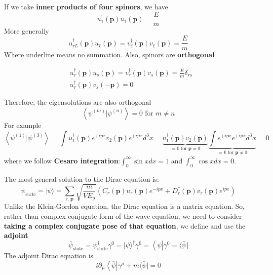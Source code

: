 If we take \textbf{inner products of four spinors}, we have
$$
u_{1}^{\dagger}(\mathbf{p}) u_{1}(\mathbf{p})=\frac{E}{m}
$$
More generally
\begin{equation}
u_{\underline{r}L}^{\dagger}(\mathbf{p}) u_{\underline{r}}(\mathbf{p})=v_{\underline{r}}^{\dagger}(\mathbf{p}) v_{\underline{r}}(\mathbf{p})=\frac{E}{m}
\end{equation}
Where underline means no summation. Also, spinors are \textbf{orthogonal}
\begin{qt}
\begin{equation}
\begin{aligned}
&u_{r}^{\dagger}(\mathbf{p}) u_{s}(\mathbf{p})=v_{r}^{\dagger}(\mathbf{p}) v_{s}(\mathbf{p})=\frac{E}{m} \delta_{r s}\\
&u_{r}^{\dagger}(\mathbf{p}) v_{s}(-\mathbf{p})=0
\end{aligned}
\label{coefficient-orthogonality}
\end{equation}
\end{qt}
Therefore, the eigensolutions are also orthogonal
\begin{equation}
\left\langle\psi^{(m)} | \psi^{(n)}\right\rangle= 0 \text { for } m \neq n
\end{equation}
For example
$$
\left\langle\psi^{(1)} | \psi^{(3)}\right\rangle=\int u_{1}^{\dagger}(\mathbf{p}) e^{+i p x} v_{2}(\mathbf{p}) e^{+i p x} d^{3} x=\underbrace{u_{1}^{\dagger}(\mathbf{p}) v_{2}(\mathbf{p})}_{=0 \text { for } \mathbf{p}=0} \underbrace{\int e^{+i p x} e^{+i p x} d^{3} x}_{=0 \text { for } \mathbf{p} \neq 0}=0
$$
where we follow \textbf{Cesaro integration}:$\int_{0}^{\infty} \sin x d x=1$ and $\int_{0}^{\infty} \cos x d x=0$.
\begin{qt}
The most general solution to the Dirac equation is:
\begin{equation}
\psi_{\text {state}}=|\psi\rangle=\sum_{r, \mathbf{p}} \sqrt{\frac{m}{V E_{\mathrm{p}}}}\left(C_{r}(\mathbf{p}) u_{r}(\mathbf{p}) e^{-i p x}+D_{r}^{\dagger}(\mathbf{p}) v_{r}(\mathbf{p}) e^{i p x}\right)
\label{general-Dirac-state}
\end{equation}
Unlike the Klein-Gordon equation, the Dirac equation is a matrix equation. So, rather than complex conjugate form of the wave equation, we need to consider \textbf{taking a complex conjugate pose of that equation}, we define  and use the \textbf{adjoint}
\begin{equation}
\bar{\psi}_{\text {state}}=\psi_{\text {state}}^{\dagger} \gamma^{0}=|\psi\rangle^{\dagger} \gamma^{0}=\left\langle\psi\left|\gamma^{0}=\langle\bar{\psi}|\right.\right.
\end{equation}
 The adjoint Dirac equation is
\begin{equation}
i \partial_{\mu}\left\langle\bar{\psi}\left|\gamma^{\mu}+m\langle\bar{\psi}|=0\right.\right.
\label{adjoint-Dirac-eq}
\end{equation}
\end{qt}
